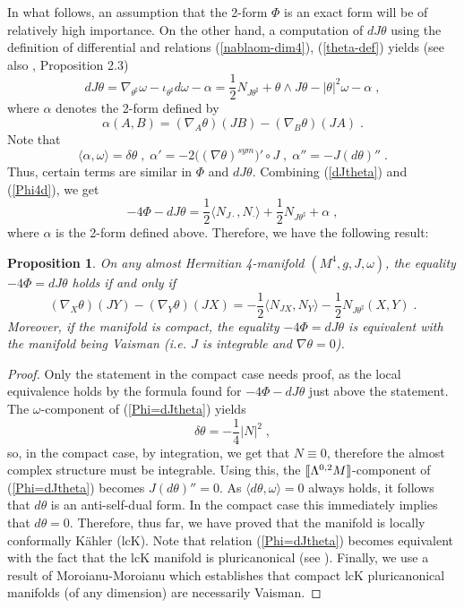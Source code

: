 \documentclass{amsart}
\newtheorem{prop}[theorem]{Proposition}
\newcommand{\La}{\Lambda}
\newcommand{\leftr}{[\hbox{\hspace{-0.15em}}[}
\newcommand{\rightr}{]\hbox{\hspace{-0.15em}}]}
\begin{document}
In what follows, an assumption that the 2-form $\Phi$ is an exact form will be of relatively high importance. On the other hand, a computation of $dJ\theta$ using the definition of differential and relations (\ref{nablaom-dim4}), (\ref{theta-def}) yields (see also \cite{DS}, Proposition 2.3)
\begin{equation} \label{dJtheta}
dJ\theta = \nabla_{\theta^{\sharp}} \omega - \iota_{\theta^{\sharp}} d\omega  - \alpha = \frac{1}{2} N_{J\theta^{\sharp}} + \theta \wedge J\theta - |\theta|^2 \omega - \alpha \;,
\end{equation}
where $\alpha$ denotes the 2-form defined by
\begin{equation*} \label{alpha-def}
   \alpha(A, B) =  (\nabla_{A} \theta)(JB) - (\nabla_{B} \theta)(JA) \; .
\end{equation*}
Note that
$$ \langle \alpha, \omega \rangle =  \delta \theta \; , \; \alpha ' = -2\big( (\nabla \theta)^{sym} \big)' \circ J \; , \; \alpha'' = - J(d\theta)'' \; .$$
Thus, certain terms are similar in $\Phi$ and $dJ\theta$. Combining (\ref{dJtheta}) and (\ref{Phi4d}), we get 
$$ - 4 \Phi - dJ \theta = \frac{1}{2} \langle N_{J\cdot}, N_{\cdot} \rangle + \frac{1}{2} N_{J\theta^{\sharp}} + \alpha \; ,$$
where $\alpha$ is the 2-form defined above. Therefore, we have the following result:
\begin{prop} \label{Phi=dJth}
 On any almost Hermitian 4-manifold $(M^4, g, J, \omega)$, the equality $-4\Phi = dJ\theta$ holds if and only if 
    \begin{equation} \label{Phi=dJtheta}
        (\nabla_X \theta)(JY) - (\nabla_Y \theta)(JX) = -\frac{1}{2} \langle N_{JX}, N_{Y} \rangle - \frac{1}{2} N_{J\theta^{\sharp}}(X,Y) \; .
    \end{equation}   
Moreover, if the manifold is compact, the equality $-4\Phi = dJ\theta$ is equivalent with the manifold being Vaisman (i.e. $J$ is integrable and $\nabla \theta = 0$).    
\end{prop}
\begin{proof}
    Only the statement in the compact case needs proof, as the local equivalence holds by the formula found for $-4\Phi - dJ\theta$ just above the statement. The $\omega$-component of (\ref{Phi=dJtheta}) yields
$$ \delta \theta = -\frac{1}{4} |N|^2 \; ,$$    
so, in the compact case, by integration, we get that $N\equiv 0$, therefore the almost complex structure must be integrable. Using this, the $\leftr \La^{0,2}M \rightr$-component of (\ref{Phi=dJtheta}) becomes $J(d\theta)''= 0$. As $\langle d\theta , \omega \rangle = 0$ always holds, it follows that $d\theta$ is an anti-self-dual form. In the compact case this immediately implies that $d \theta =0$. Therefore, thus far, we have proved that the manifold is locally conformally K\"ahler (lcK). Note that relation (\ref{Phi=dJtheta}) becomes equivalent with the fact that the lcK manifold is pluricanonical (see \cite{Kok}). Finally, we use a result of Moroianu-Moroianu \cite{MM} which establishes that compact lcK pluricanonical manifolds (of any dimension) are necessarily Vaisman.
\end{proof}
    
\end{document}
